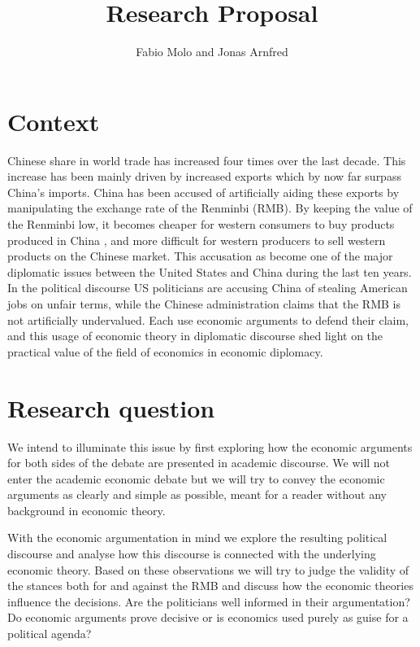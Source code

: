 \documentclass[11pt]{article}
\title{Research Proposal}
\author{Fabio Molo and Jonas Arnfred}
\begin{document}
\maketitle

\section{Context}

Chinese share in world trade has increased four times over the last decade. This increase has been mainly driven by increased 
exports which by now far surpass China's imports.
China has been accused of artificially aiding these exports by 
manipulating the exchange rate of the Renminbi (RMB). By keeping the value of 
the Renminbi low, it becomes cheaper for western consumers to buy products produced in China 
, and more difficult for western producers to sell western products on the Chinese market.
This accusation as become one of the major diplomatic issues between the 
United States and China during the last ten years. In the political 
discourse US politicians are accusing China of stealing American jobs on 
unfair terms, while the Chinese administration claims that the RMB is 
not artificially undervalued.  Each use economic arguments to defend 
their claim, and this usage of economic theory in diplomatic discourse 
shed light on the practical value of the field of economics in economic 
diplomacy.

\section{Research question}

We intend to illuminate this issue by first exploring how the economic 
arguments for both sides of the debate are presented in academic discourse. We will not enter the academic economic debate but we will try to convey the economic 
arguments as clearly and simple as possible, meant for a reader without any 
background in economic theory.  

With the economic argumentation in mind we explore the resulting 
political discourse and analyse how this discourse is connected with the 
underlying economic theory.  Based on these observations we will try to 
judge the validity of the stances both for and against the RMB and 
discuss how the economic theories influence the decisions. Are the 
politicians well informed in their argumentation? Do economic arguments prove decisive or is 
economics used purely as guise for a political agenda?
\end{document}
